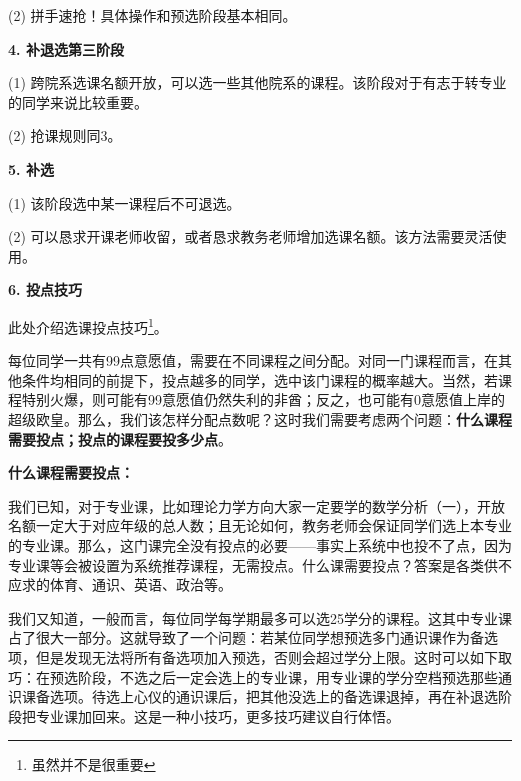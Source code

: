 \documentclass[11pt,oneside]{book}
\begin{document}
(2) 拼手速抢！具体操作和预选阶段基本相同。

\vspace{10pt}

\textbf{4. 补退选第三阶段}

\vspace{10pt}

(1) 跨院系选课名额开放，可以选一些其他院系的课程。该阶段对于有志于转专业的同学来说比较重要。

\vspace{10pt}

(2) 抢课规则同3。

\vspace{10pt}

\textbf{5. 补选}

\vspace{10pt}

(1) 该阶段选中某一课程后不可退选。

\vspace{10pt}

(2) 可以恳求开课老师收留，或者恳求教务老师增加选课名额。该方法需要灵活使用。

\vspace{10pt}

\textbf{6. 投点技巧}

此处介绍选课投点技巧\footnote{虽然并不是很重要}。

\vspace{10pt}

每位同学一共有99点意愿值，需要在不同课程之间分配。对同一门课程而言，在其他条件均相同的前提下，投点越多的同学，选中该门课程的概率越大。当然，若课程特别火爆，则可能有99意愿值仍然失利的非酋；反之，也可能有0意愿值上岸的超级欧皇。那么，我们该怎样分配点数呢？这时我们需要考虑两个问题：\textbf{什么课程需要投点；投点的课程要投多少点}。

\vspace{10pt}

\textbf{什么课程需要投点：}

\vspace{10pt}

我们已知，对于专业课，比如理论力学方向大家一定要学的数学分析（一），开放名额一定大于对应年级的总人数；且无论如何，教务老师会保证同学们选上本专业的专业课。那么，这门课完全没有投点的必要——事实上系统中也投不了点，因为专业课等会被设置为系统推荐课程，无需投点。什么课需要投点？答案是各类供不应求的体育、通识、英语、政治等。

\vspace{10pt}

我们又知道，一般而言，每位同学每学期最多可以选25学分的课程。这其中专业课占了很大一部分。这就导致了一个问题：若某位同学想预选多门通识课作为备选项，但是发现无法将所有备选项加入预选，否则会超过学分上限。这时可以如下取巧：在预选阶段，不选之后一定会选上的专业课，用专业课的学分空档预选那些通识课备选项。待选上心仪的通识课后，把其他没选上的备选课退掉，再在补退选阶段把专业课加回来。这是一种小技巧，更多技巧建议自行体悟。
\end{document}
